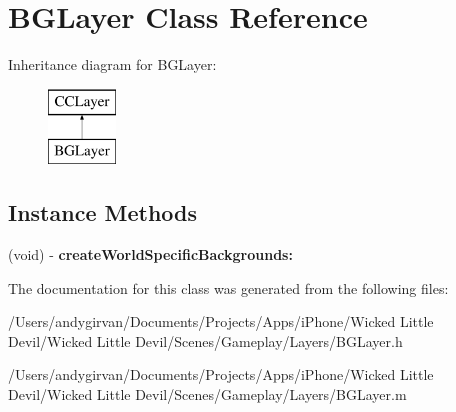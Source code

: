 \hypertarget{interface_b_g_layer}{\section{B\-G\-Layer Class Reference}
\label{interface_b_g_layer}
}
Inheritance diagram for B\-G\-Layer\-:\begin{figure}[H]
\begin{center}
\leavevmode
\includegraphics[height=2.000000cm]{interface_b_g_layer}
\end{center}
\end{figure}
\subsection*{Instance Methods}
\begin{DoxyCompactItemize}
\item 
\hypertarget{interface_b_g_layer_a89d871d560790f11f8a2adca4dff4f7a}{(void) -\/ {\bfseries create\-World\-Specific\-Backgrounds\-:}}\label{interface_b_g_layer_a89d871d560790f11f8a2adca4dff4f7a}

\end{DoxyCompactItemize}


The documentation for this class was generated from the following files\-:\begin{DoxyCompactItemize}
\item 
/\-Users/andygirvan/\-Documents/\-Projects/\-Apps/i\-Phone/\-Wicked Little Devil/\-Wicked Little Devil/\-Scenes/\-Gameplay/\-Layers/B\-G\-Layer.\-h\item 
/\-Users/andygirvan/\-Documents/\-Projects/\-Apps/i\-Phone/\-Wicked Little Devil/\-Wicked Little Devil/\-Scenes/\-Gameplay/\-Layers/B\-G\-Layer.\-m\end{DoxyCompactItemize}
